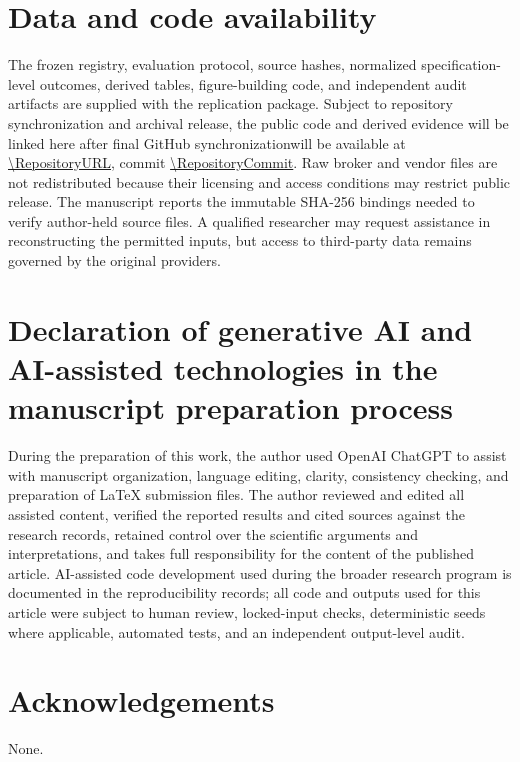 \documentclass[a4paper,fleqn]{cas-sc}
\begin{document}
\section*{Data and code availability}
The frozen registry, evaluation protocol, source hashes, normalized specification-level outcomes, derived tables, figure-building code, and independent audit artifacts are supplied with the replication package. Subject to repository synchronization and archival release, the public code and derived evidence \if\relax\detokenize\expandafter{\RepositoryURL}\relax will be linked here after final GitHub synchronization\else will be available at \expandafter\url\expandafter{\RepositoryURL}, commit \expandafter\url\expandafter{\RepositoryCommit}\fi. Raw broker and vendor files are not redistributed because their licensing and access conditions may restrict public release. The manuscript reports the immutable SHA-256 bindings needed to verify author-held source files. A qualified researcher may request assistance in reconstructing the permitted inputs, but access to third-party data remains governed by the original providers.

\section*{Declaration of generative AI and AI-assisted technologies in the manuscript preparation process}
During the preparation of this work, the author used OpenAI ChatGPT to assist with manuscript organization, language editing, clarity, consistency checking, and preparation of LaTeX submission files. The author reviewed and edited all assisted content, verified the reported results and cited sources against the research records, retained control over the scientific arguments and interpretations, and takes full responsibility for the content of the published article. AI-assisted code development used during the broader research program is documented in the reproducibility records; all code and outputs used for this article were subject to human review, locked-input checks, deterministic seeds where applicable, automated tests, and an independent output-level audit.

\section*{Acknowledgements}
None.



\end{document}
